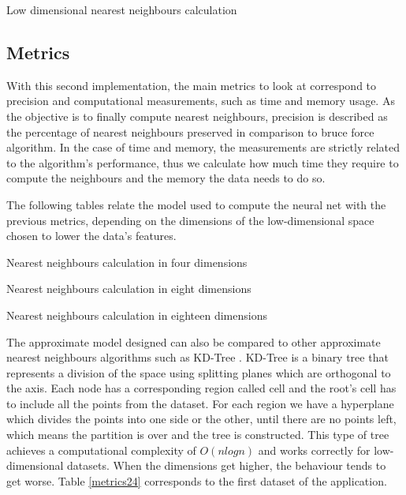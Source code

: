 \documentclass[a4paper,11pt,spanish]{report}
\makeatletter
\def\BState{\State\hskip-\ALG@thistlm}
\makeatother
\begin{document}
\begin{algorithm}
\caption{Low dimensional nearest neighbours calculation}
\end{algorithm}

\subsection{Metrics}
\label{ssec:met2}

With this second implementation, the main metrics to look at correspond to precision and computational measurements, such as time and memory usage. As the objective is to finally compute nearest neighbours, precision is described as the percentage of nearest neighbours preserved in comparison to bruce force algorithm. In the case of time and memory, the measurements are strictly related to the algorithm's performance, thus we calculate how much time they require to compute the neighbours and the memory the data needs to do so.

The following tables relate the model used to compute the neural net with the previous metrics, depending on the dimensions of the low-dimensional space chosen to lower the data's features.

\begin{table}[p]
\centering

\caption{\label{metrics21}Nearest neighbours calculation in four dimensions}
\end{table}

\begin{table}[p]
\centering

\caption{\label{metrics22}Nearest neighbours calculation in eight dimensions}
\end{table}

\begin{table}[p]
\centering

\caption{\label{metrics23}Nearest neighbours calculation in eighteen dimensions}
\end{table}

The approximate model designed can also be compared to other approximate nearest neighbours algorithms such as KD-Tree \citep{kdtree}. KD-Tree is a binary tree that represents a division of the space using splitting planes which are orthogonal to the axis. Each node has a corresponding region called cell and the root's cell has to include all the points from the dataset. For each region we have a hyperplane which divides the points into one side or the other, until there are no points left, which means the partition is over and the tree is constructed. This type of tree achieves a computational complexity of $O(nlogn)$ and works correctly for low-dimensional datasets. When the dimensions get higher, the behaviour tends to get worse. Table \ref{metrics24} corresponds to the first dataset of the application.
\end{document}
